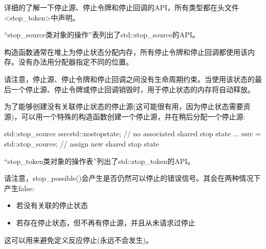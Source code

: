 
详细的了解一下停止源、停止令牌和停止回调的API，所有类型都在头文件<stop\_token>中声明。


“stop\_source类对象的操作”表列出了std::stop\_source的API。

构造函数通常在堆上为停止状态分配内存，所有停止令牌和停止回调都使用该内存。没有办法用分配器指定不同的位置。

请注意，停止源、停止令牌和停止回调之间没有生命周期约束。当使用该状态的最后一个停止源、停止令牌或停止回调销毁时，用于停止状态的内存将自动释放。

为了能够创建没有关联停止状态的停止源(这可能很有用，因为停止状态需要资源)，可以用一个特殊的构造函数创建一个停止源，并在稍后分配一个停止源:

\begin{cpp}
std::stop_source ssrc{std::nostopstate}; // no associated shared stop state
...
ssrc = std::stop_source{}; // assign new shared stop state
\end{cpp}



“stop\_token类对象的操作表”列出了std::stop\_token的API。

请注意，stop\_possible()会产生是否仍然可以停止的错误信号。其会在两种情况下产生false:

\begin{itemize}
\item 
若没有关联的停止状态

\item 
若存在停止状态，但不再有停止源，并且从未请求过停止
\end{itemize}

这可以用来避免定义反应停止(永远不会发生)。

